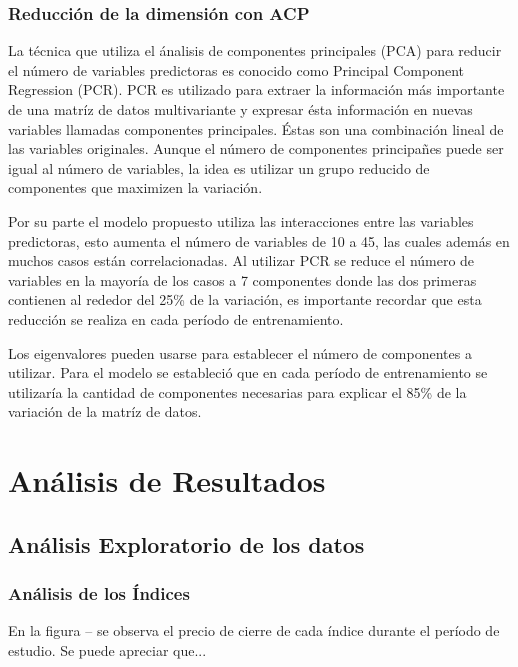 \documentclass[a4paper,12pt]{Latex/Classes/PhDthesisPSnPDF}
\begin{document}
\subsection{Reducción de la dimensión con ACP}

La técnica que utiliza el ánalisis de componentes principales (PCA) para reducir el número de variables predictoras es conocido como Principal Component Regression (PCR). PCR es utilizado para extraer la información más importante de una matríz de datos multivariante y expresar ésta información en nuevas variables llamadas componentes principales. Éstas son una combinación lineal de las variables originales. Aunque el número de componentes principañes puede ser igual al número de variables, la idea es utilizar un grupo reducido de componentes que maximizen la variación.

Por su parte el modelo propuesto utiliza las interacciones entre las variables predictoras, esto aumenta el número de variables de 10 a 45, las cuales además en muchos casos están correlacionadas. Al utilizar PCR se reduce el número de variables en la mayoría de los casos a 7 componentes donde las dos primeras contienen al rededor del 25\% de la variación, es importante recordar que esta reducción se realiza en cada período de entrenamiento. 

Los eigenvalores pueden usarse para establecer el número de componentes a utilizar. Para el modelo se estableció que en cada período de entrenamiento se utilizaría la cantidad de componentes necesarias para explicar el 85\% de la variación de la matríz de datos.



\chapter{Análisis de Resultados}

\section{Análisis Exploratorio de los datos}

\subsection{Análisis de los Índices}

En la figura -- se observa el precio de cierre de cada índice durante el período de estudio. Se puede apreciar que...
\end{document}
